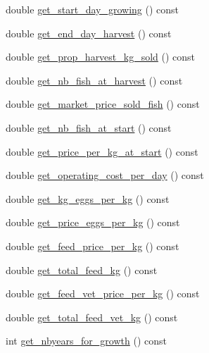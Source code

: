 \begin{DoxyCompactItemize}
\item 
double \mbox{\hyperlink{class_fishfarm_a1d00b6c519f683c07d12334f9e733b49}{get\+\_\+start\+\_\+day\+\_\+growing}} () const
\item 
double \mbox{\hyperlink{class_fishfarm_a6d3690c15c3a5ab3aa76307be41177d1}{get\+\_\+end\+\_\+day\+\_\+harvest}} () const
\item 
double \mbox{\hyperlink{class_fishfarm_a3c599c36b4ff6e303f28b9dccf87fe01}{get\+\_\+prop\+\_\+harvest\+\_\+kg\+\_\+sold}} () const
\item 
double \mbox{\hyperlink{class_fishfarm_aaebff35b526722b8fa8f4476f6121dd8}{get\+\_\+nb\+\_\+fish\+\_\+at\+\_\+harvest}} () const
\item 
double \mbox{\hyperlink{class_fishfarm_a4a78d278c4acc527c4212833e89bbbda}{get\+\_\+market\+\_\+price\+\_\+sold\+\_\+fish}} () const
\item 
double \mbox{\hyperlink{class_fishfarm_a4cbdb503058458f6c78610026d40fff5}{get\+\_\+nb\+\_\+fish\+\_\+at\+\_\+start}} () const
\item 
double \mbox{\hyperlink{class_fishfarm_aff573924f0ebf5f2b21f715d317aa594}{get\+\_\+price\+\_\+per\+\_\+kg\+\_\+at\+\_\+start}} () const
\item 
double \mbox{\hyperlink{class_fishfarm_a25c20e3fc0a6fe54e46280288cb70682}{get\+\_\+operating\+\_\+cost\+\_\+per\+\_\+day}} () const
\item 
double \mbox{\hyperlink{class_fishfarm_aeb602bf440eafa1459146cc06b277255}{get\+\_\+kg\+\_\+eggs\+\_\+per\+\_\+kg}} () const
\item 
double \mbox{\hyperlink{class_fishfarm_ae1e420d25aca0fb65f199d4f16b40b1b}{get\+\_\+price\+\_\+eggs\+\_\+per\+\_\+kg}} () const
\item 
double \mbox{\hyperlink{class_fishfarm_ab4c74d76a064d293c8f51481446ff5a9}{get\+\_\+feed\+\_\+price\+\_\+per\+\_\+kg}} () const
\item 
double \mbox{\hyperlink{class_fishfarm_ac1e7001a0c92606f05999db104a631fc}{get\+\_\+total\+\_\+feed\+\_\+kg}} () const
\item 
double \mbox{\hyperlink{class_fishfarm_a8cd365afbb7bb3c4c9befb1014f7e1ce}{get\+\_\+feed\+\_\+vet\+\_\+price\+\_\+per\+\_\+kg}} () const
\item 
double \mbox{\hyperlink{class_fishfarm_ae76f61ab5132ffbd8a76318d261320eb}{get\+\_\+total\+\_\+feed\+\_\+vet\+\_\+kg}} () const
\item 
int \mbox{\hyperlink{class_fishfarm_ab458d0fb8b938d36dab778d045d99138}{get\+\_\+nbyears\+\_\+for\+\_\+growth}} () const

\end{DoxyCompactItemize}
